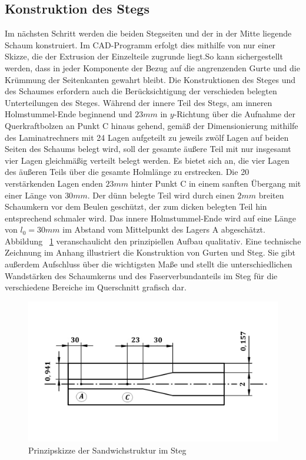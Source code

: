 \subsection{Konstruktion des Stegs}
\noindent Im nächsten Schritt werden die beiden Stegseiten und der in der Mitte liegende Schaum konstruiert. Im CAD-Programm erfolgt dies mithilfe von nur einer Skizze, die der Extrusion der Einzelteile zugrunde liegt.So kann sichergestellt werden, dass in jeder Komponente der Bezug auf die angrenzenden Gurte und die Krümmung der Seitenkanten gewahrt bleibt. Die Konstruktionen des Steges und des Schaumes erfordern auch die Berücksichtigung der verschieden belegten Unterteilungen des Steges. Während der innere Teil des Stegs, am inneren Holmstummel-Ende beginnend und $ 23mm $ in $y$-Richtung über die Aufnahme der Querkraftbolzen an Punkt C hinaus gehend, gemäß der Dimensionierung mithilfe des Laminatrechners mit 24 Lagen aufgeteilt zu jeweils zwölf Lagen auf beiden Seiten des Schaums belegt wird, soll der gesamte äußere Teil mit nur insgesamt vier Lagen gleichmäßig verteilt belegt werden. Es bietet sich an, die vier Lagen des äußeren Teils über die gesamte Holmlänge zu erstrecken. Die 20 verstärkenden Lagen enden $ 23mm $ hinter Punkt C in einem sanften Übergang mit einer Länge von $ 30mm $. Der dünn belegte Teil wird durch einen $ 2mm $ breiten Schaumkern vor dem Beulen geschützt, der zum dicken belegten Teil hin entsprechend schmaler wird. Das innere Holmstummel-Ende wird auf eine Länge von $ l_{0}=30mm $ im Abstand vom Mittelpunkt des Lagers A abgeschätzt. Abbildung ~\ref{fig: Steg} veranschaulicht den prinzipiellen Aufbau qualitativ. Eine technische Zeichnung im Anhang illustriert die Konstruktion von Gurten und Steg. Sie gibt außerdem Aufschluss über die wichtigsten Maße und stellt die unterschiedlichen Wandstärken des Schaumkerns und des Faserverbundanteils im Steg für die verschiedene Bereiche im Querschnitt grafisch dar.

\begin{figure}[h]
	\includegraphics[width=1.0\textwidth]{Bilder/StegPrinzip.jpg}
	\caption{Prinzipskizze der Sandwichstruktur im Steg}
	\label{fig: Steg}
\end{figure}


